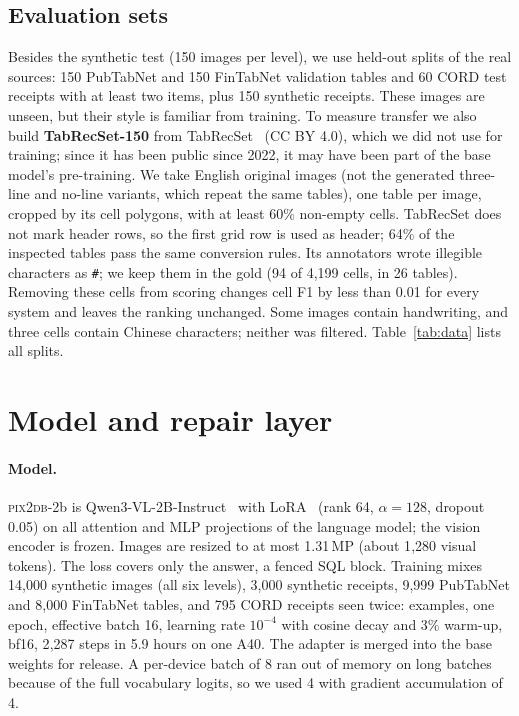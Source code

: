 \documentclass[10pt,twocolumn]{article}
\newcommand{\sys}{\textsc{pix2db}}
\begin{document}
\subsection{Evaluation sets}
Besides the synthetic test (150 images per level), we use held-out splits of the real sources: 150 PubTabNet and
150 FinTabNet validation tables and 60 CORD test receipts with at least two items, plus 150 synthetic receipts.
These images are unseen, but their style is familiar from training. To measure transfer we also build
\textbf{TabRecSet-150} from TabRecSet~\citep{yang2023tabrecset,tabrecsetdata} (CC BY 4.0), which we did not use for
training; since it has been public since 2022, it may have been part of the base model's pre-training. We take
English original images (not the generated three-line and no-line variants, which repeat the same tables), one
table per image, cropped by its cell polygons, with at least 60\% non-empty cells. TabRecSet does not mark header
rows, so the first grid row is used as header; 64\% of the inspected tables pass the same conversion rules. Its
annotators wrote illegible characters as \texttt{\#}; we keep them in the gold (94 of 4{,}199 cells, in 26 tables).
Removing these cells from scoring changes cell F1 by less than 0.01 for every system and leaves the ranking
unchanged. Some images contain handwriting, and three cells contain Chinese characters; neither was filtered.
Table~\ref{tab:data} lists all splits.

\section{Model and repair layer}
\label{sec:model}

\paragraph{Model.} \sys-2b is Qwen3-VL-2B-Instruct~\citep{bai2025qwen3vl} with LoRA~\citep{hu2022lora} (rank 64,
$\alpha=128$, dropout 0.05) on all attention and MLP projections of the language model; the vision encoder is
frozen. Images are resized to at most 1.31\,MP (about 1{,}280 visual tokens). The loss covers only the answer,
a fenced SQL block. Training mixes 14{,}000 synthetic images (all six levels), 3{,}000 synthetic receipts,
9{,}999 PubTabNet and 8{,}000 FinTabNet tables, and 795 CORD receipts seen twice: \Nntrainused{} examples, one epoch, effective batch 16, learning rate
$10^{-4}$ with cosine decay and 3\% warm-up, bf16, 2{,}287 steps in 5.9 hours on one A40. The adapter is merged
into the base weights for release. A per-device batch of 8 ran out of memory on long batches because of the full
vocabulary logits, so we used 4 with gradient accumulation of 4.
\end{document}
